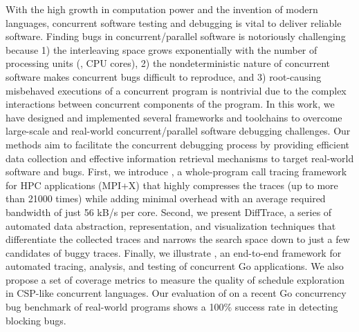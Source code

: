 
With the high growth in computation power and the invention of modern languages, concurrent software testing and debugging is vital to deliver reliable software.
%
Finding bugs in concurrent/parallel software is notoriously challenging because 1) the interleaving space grows exponentially with the number of processing units (\eg, CPU cores), 2) the nondeterministic nature of concurrent software makes concurrent bugs difficult to reproduce, and 3) root-causing misbehaved executions of a concurrent program is nontrivial due to the complex interactions between concurrent components of the program.
%
In this work, we have designed and implemented several frameworks and toolchains to overcome large-scale and real-world concurrent/parallel software debugging challenges.
%
Our methods aim to facilitate the concurrent debugging process by providing efficient data collection and effective information retrieval mechanisms to target real-world software and bugs.
%
First, we introduce \parlot, a whole-program call tracing framework for HPC applications (MPI+X) that highly compresses the traces (up to more than 21000 times) while adding minimal overhead with an average required bandwidth of just 56 kB/s per core.
%
Second, we present DiffTrace, a series of automated data abstraction, representation, and visualization techniques that differentiate the collected \parlot traces and narrows the search space down to just a few candidates of buggy traces.
%
Finally, we illustrate \goat, an end-to-end framework for automated tracing, analysis, and testing of concurrent Go applications.
%
We also propose a set of coverage metrics to measure the quality of schedule exploration in CSP-like concurrent languages.
%
Our evaluation of \goat on a recent Go concurrency bug benchmark of real-world programs shows a 100\% success rate in detecting blocking bugs.
